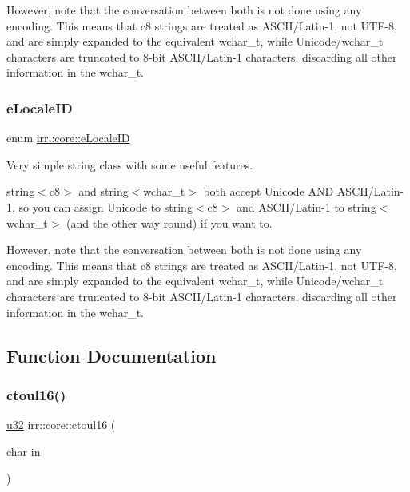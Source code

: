 However, note that the conversation between both is not done using any encoding. This means that c8 strings are treated as A\+S\+C\+I\+I/\+Latin-\/1, not U\+T\+F-\/8, and are simply expanded to the equivalent wchar\+\_\+t, while Unicode/wchar\+\_\+t characters are truncated to 8-\/bit A\+S\+C\+I\+I/\+Latin-\/1 characters, discarding all other information in the wchar\+\_\+t. \mbox{\label{namespaceirr_1_1core_a4682709540c80568b555acc36dbf3a4a}} 
\subsubsection{\texorpdfstring{e\+Locale\+ID}{eLocaleID}\hspace{0.1cm}{\footnotesize\ttfamily [2/2]}}
{\footnotesize\ttfamily enum \hyperlink{namespaceirr_1_1core_a4682709540c80568b555acc36dbf3a4a}{irr\+::core\+::e\+Locale\+ID}}



Very simple string class with some useful features. 

string$<$c8$>$ and string$<$wchar\+\_\+t$>$ both accept Unicode A\+ND A\+S\+C\+I\+I/\+Latin-\/1, so you can assign Unicode to string$<$c8$>$ and A\+S\+C\+I\+I/\+Latin-\/1 to string$<$wchar\+\_\+t$>$ (and the other way round) if you want to.

However, note that the conversation between both is not done using any encoding. This means that c8 strings are treated as A\+S\+C\+I\+I/\+Latin-\/1, not U\+T\+F-\/8, and are simply expanded to the equivalent wchar\+\_\+t, while Unicode/wchar\+\_\+t characters are truncated to 8-\/bit A\+S\+C\+I\+I/\+Latin-\/1 characters, discarding all other information in the wchar\+\_\+t. 

\subsection{Function Documentation}
\mbox{\label{namespaceirr_1_1core_a8b818c2189b834bffacd522ff752c3a6}} 
\subsubsection{\texorpdfstring{ctoul16()}{ctoul16()}}
{\footnotesize\ttfamily \hyperlink{namespaceirr_a0416a53257075833e7002efd0a18e804}{u32} irr\+::core\+::ctoul16 (\begin{DoxyParamCaption}\item[{char}]{in }\end{DoxyParamCaption})\hspace{0.3cm}{\ttfamily [inline]}}




